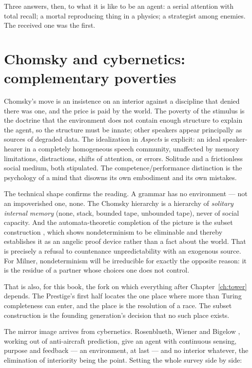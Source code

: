 Three answers, then, to what it is like to be an agent: a serial
attention with total recall; a mortal reproducing thing in a
physics; a strategist among enemies.
The received one was the first.

\section{Chomsky and cybernetics: complementary poverties}
\label{psy:sec:chomsky}

Chomsky's move \cite{chomsky1956,chomsky1957,chomsky1959} is an
insistence on an interior against a discipline that denied there was
one, and the price is paid by the world.
The poverty of the stimulus is the doctrine that the environment
does not contain enough structure to explain the agent, so the
structure must be innate; other speakers appear principally as
sources of degraded data.
The idealization in \emph{Aspects} \cite{chomsky1965} is explicit:
an ideal speaker-hearer in a completely homogeneous speech
community, unaffected by memory limitations, distractions, shifts of
attention, or errors.
Solitude and a frictionless social medium, both stipulated.
The competence/performance distinction is the psychology of a mind
that disowns its own embodiment and its own mistakes.

The technical shape confirms the reading.
A grammar has no environment --- not an impoverished one, none.
The Chomsky hierarchy is a hierarchy of \emph{solitary internal
memory} (none, stack, bounded tape, unbounded tape), never of social
capacity.
And the automata-theoretic completion of the picture is the subset
construction \cite{rabinscott1959}, which shows nondeterminism to be
eliminable and thereby establishes it as an angelic proof device
rather than a fact about the world.
That is precisely a refusal to countenance unpredictability with an
exogenous source.
For Milner, nondeterminism will be irreducible for exactly the
opposite reason: it is the residue of a partner whose choices one
does not control.

That is also, for this book, the fork on which everything after
Chapter~\ref{ch:tower} depends.
The Prestige's first half locates the one place where more than
Turing completeness can enter, and the place is the resolution of a
race.
The subset construction is the founding generation's decision that
no such place exists.

The mirror image arrives from cybernetics.
Rosenblueth, Wiener and Bigelow \cite{rwb1943}, working out of
anti-aircraft prediction, give an agent with continuous sensing,
purpose and feedback --- an environment, at last --- and no interior
whatever, the elimination of interiority being the point.
Setting the whole survey side by side:

